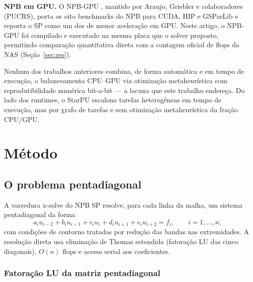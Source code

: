 \documentclass[12pt]{article}
\begin{document}
\textbf{NPB em GPU.} O NPB-GPU \cite{araujo:2021}, mantido por Araujo,
Griebler e colaboradores (PUCRS), porta os oito benchmarks do NPB para CUDA,
HIP e GSParLib e reporta o SP como um dos de menor aceleração em GPU. Neste
artigo, o NPB-GPU foi compilado e executado na mesma placa que o solver
proposto, permitindo comparação quantitativa direta com a contagem oficial
de flops da NAS (Seção~\ref{sec:res}).

Nenhum dos trabalhos anteriores combina, de forma automática e em tempo de
execução, o balanceamento CPU--GPU via otimização metaheurística com
reprodutibilidade numérica bit-a-bit — a lacuna que este trabalho endereça.
Do lado dos runtimes, o StarPU \cite{starpu:2011} escalona tarefas
heterogêneas em tempo de execução, mas por grafo de tarefas e sem
otimização metaheurística da fração CPU/GPU.

\section{Método}\label{sec:metodo}

\subsection{O problema pentadiagonal}

A varredura x-solve do NPB SP resolve, para cada linha da malha, um sistema
pentadiagonal da forma
\begin{equation}
  a_i u_{i-2} + b_i u_{i-1} + c_i u_i + d_i u_{i+1} + e_i u_{i+2} = f_i,
  \qquad i = 1, \dots, n,
  \label{eq:penta}
\end{equation}
com condições de contorno tratadas por redução das bandas nas extremidades.
A resolução direta usa eliminação de Thomas estendida
\cite{thomas:1949} (fatoração LU das
cinco diagonais), $O(n)$ flops e acesso serial aos coeficientes.

\subsubsection{Fatoração LU da matriz pentadiagonal}
\end{document}

